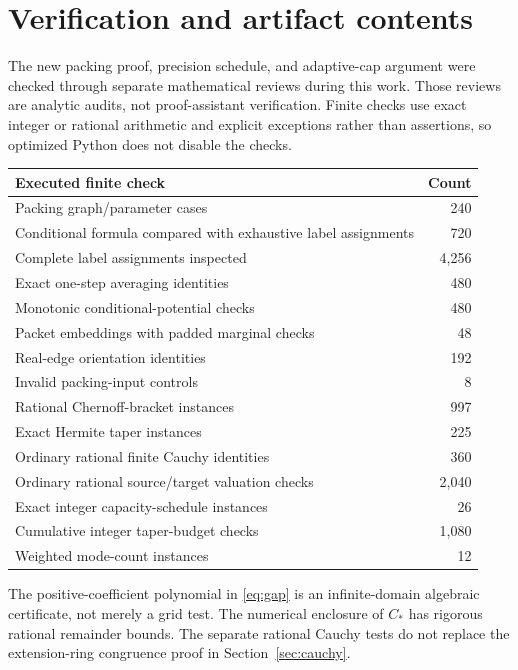 \documentclass[11pt,letterpaper]{article}
\numberwithin{equation}{section}
\theoremstyle{definition}\newtheorem{definition}[theorem]{Definition}
\theoremstyle{remark}\newtheorem{remark}[theorem]{Remark}
\newcommand{\Cstar}{C_*}
\begin{document}
\section{Verification and artifact contents}
\label{sec:verification}

The new packing proof, precision schedule, and adaptive-cap argument were
checked through separate mathematical reviews during this work. Those
reviews are analytic audits, not proof-assistant verification.
Finite checks use exact integer or rational arithmetic and explicit
exceptions rather than assertions, so optimized Python does not disable
the checks.

\begin{center}
\begin{tabular}{@{}p{.69\linewidth}r@{}}
\toprule
Executed finite check & Count\\
\midrule
Packing graph/parameter cases & 240\\
Conditional formula compared with exhaustive label assignments & 720\\
Complete label assignments inspected & 4,256\\
Exact one-step averaging identities & 480\\
Monotonic conditional-potential checks & 480\\
Packet embeddings with padded marginal checks & 48\\
Real-edge orientation identities & 192\\
Invalid packing-input controls & 8\\
Rational Chernoff-bracket instances & 997\\
Exact Hermite taper instances & 225\\
Ordinary rational finite Cauchy identities & 360\\
Ordinary rational source/target valuation checks & 2,040\\
Exact integer capacity-schedule instances & 26\\
Cumulative integer taper-budget checks & 1,080\\
Weighted mode-count instances & 12\\
\bottomrule
\end{tabular}
\end{center}

The positive-coefficient polynomial in \eqref{eq:gap} is an
infinite-domain algebraic certificate, not merely a grid test.
The numerical enclosure of $\Cstar$ has rigorous rational remainder
bounds. The separate rational Cauchy tests do not replace the
extension-ring congruence proof in Section~\ref{sec:cauchy}.
\end{document}
